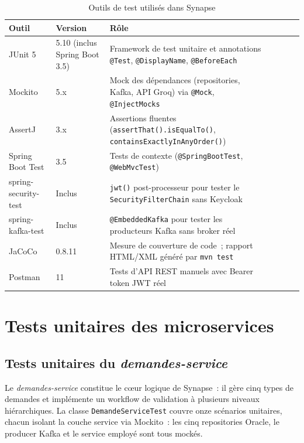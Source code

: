 \begin{table}[H]
\centering
\caption{Outils de test utilisés dans Synapse}
\label{tab:outils_test}
\begin{tabularx}{\textwidth}{VlVlVLV}
\hline
\textbf{Outil} & \textbf{Version} & \textbf{Rôle} \\
\hline
JUnit 5 & 5.10 (inclus Spring Boot 3.5) & Framework de test unitaire et annotations \texttt{@Test}, \texttt{@DisplayName}, \texttt{@BeforeEach} \\
\hline
Mockito & 5.x & Mock des dépendances (repositories, Kafka, API Groq) via \texttt{@Mock}, \texttt{@InjectMocks} \\
\hline
AssertJ & 3.x & Assertions fluentes (\texttt{assertThat().isEqualTo()}, \texttt{containsExactlyInAnyOrder()}) \\
\hline
Spring Boot Test & 3.5 & Tests de contexte (\texttt{@SpringBootTest}, \texttt{@WebMvcTest}) \\
\hline
spring-security-test & Inclus & \texttt{jwt()} post-processeur pour tester le \texttt{SecurityFilterChain} sans Keycloak \\
\hline
spring-kafka-test & Inclus & \texttt{@EmbeddedKafka} pour tester les producteurs Kafka sans broker réel \\
\hline
JaCoCo & 0.8.11 & Mesure de couverture de code~; rapport HTML/XML généré par \texttt{mvn test} \\
\hline
Postman & 11 & Tests d'API REST manuels avec Bearer token JWT réel \\
\hline
\end{tabularx}
\end{table}

\section{Tests unitaires des microservices}

\subsection{Tests unitaires du \textit{demandes-service}}

Le \textit{demandes-service} constitue le cœur logique de Synapse~: il gère cinq
types de demandes et implémente un workflow de validation à plusieurs niveaux
hiérarchiques. La classe \texttt{DemandeServiceTest} couvre onze scénarios unitaires,
chacun isolant la couche service via Mockito~: les cinq repositories Oracle, le
producer Kafka et le service employé sont tous mockés.

